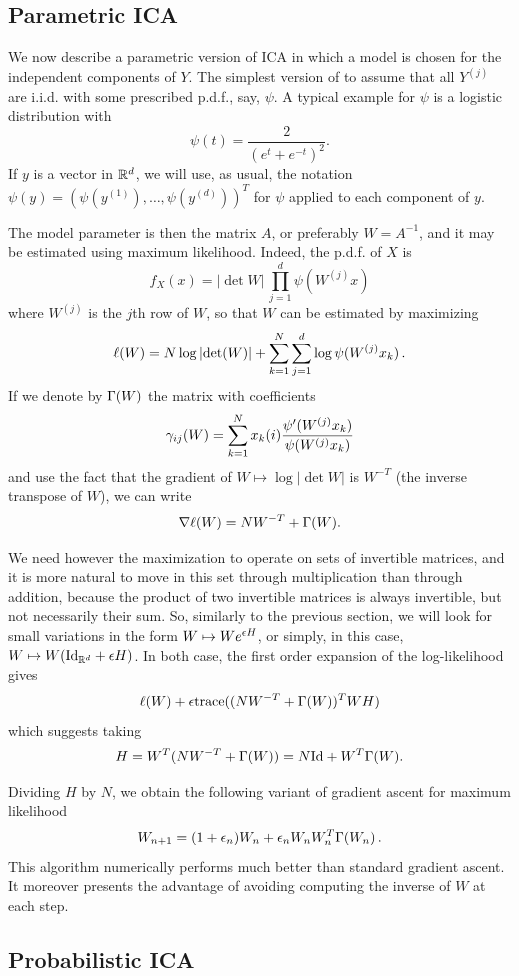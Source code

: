 \subsection{Parametric ICA}
We now describe a parametric version of ICA in which a model is chosen for the independent components of $Y$. The simplest version of to assume that all $Y^{(j)}$ are i.i.d. with some prescribed p.d.f., say, $\psi$. A typical example for $\psi$ is a logistic distribution with
\[
\psi(t) = \frac{2}{(e^t+
e^{-t})^2}.
\]
If $y$ is a vector in ${\mathbb{R}}^d$, we will use, as usual, the notation $\psi(y)  = (\psi(y^{(1)}), \ldots, \psi(y^{(d)}))^T$ for $\psi$ applied to each component of $y$.

The model parameter is then the matrix $A$, or preferably $W = A^{-1}$, and it may be estimated using maximum likelihood. Indeed, the p.d.f. of $X$ is
$$
f_X(x) = |\det W|\, \prod_{j=1}^d \psi(W^{(j)}x)
$$
where $W^{(j)}$ is the $j$th row of $W$, so that $W$ can be estimated by maximizing
\[
\ell(W) = N \log\left| \text{det}(W) \right| +  \sum_{k=1}^N \sum_{j=1}^d \log \psi(W^{(j)}x_k)\,.
\]
If we denote by $\Gamma(W)$ the matrix with coefficients 
\[
\gamma_{ij}(W) = \sum_{k=1}^N x_k(i) \frac{\psi'(W^{(j)}x_k)}{\psi(W^{(j)}x_k)}
\]
and use the fact that the gradient of $W \mapsto \log |\det W|$ is $W^{-T}$ (the inverse transpose of $W$), we can write
\[
\nabla \ell(W) = NW^{-T} + \Gamma(W).
\] 

We need however the maximization to operate on sets of invertible matrices, and it is more natural to move in this set through multiplication than through addition, because the product of two invertible matrices is always invertible, but not necessarily their sum. So, similarly to the previous section, we will look for small variations in the form  $W \mapsto We^{\epsilon H}$, or simply, in this case, $W \mapsto W(\Id[d] + \ep H)$. In both case, the first order expansion of the log-likelihood gives
\[
\ell(W) + \epsilon {\mathrm{trace}}((NW^{-T} + \Gamma(W))^TWH)
\]
which suggests taking 
\[
H = W^T(NW^{-T} + \Ga(W)) = N\Id + W^T\Ga(W).
\]

Dividing $H$ by $N$, we obtain the following variant of gradient ascent for maximum likelihood
\[
W_{n+1} = (1 + \epsilon_n) W_n +  \epsilon_n W_nW_n^T\Gamma(W_n)\,.
\]
This algorithm numerically performs much better than standard gradient ascent. It moreover presents the advantage of avoiding computing the inverse of $W$ at each step. 


\subsection{Probabilistic ICA}

